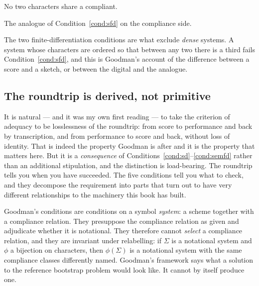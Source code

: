 \begin{condition}
\label{cond:semd}
No two characters share a compliant.
\end{condition}

\begin{condition}
\label{cond:semfd}
The analogue of Condition~\ref{cond:sfd} on the compliance side.
\end{condition}

\noindent
The two finite-differentiation conditions are what exclude
\emph{dense} systems.
A system whose characters are ordered so that between any two there
is a third fails Condition~\ref{cond:sfd}, and this is Goodman's
account of the difference between a score and a sketch, or between
the digital and the analogue.

\subsection{The roundtrip is derived, not primitive}
\label{sec:roundtrip}

It is natural --- and it was my own first reading --- to take the
criterion of adequacy to be losslessness of the roundtrip: from
score to performance and back by transcription, and from
performance to score and back, without loss of identity.
That is indeed the property Goodman is after and it is the property
that matters here.
But it is a \emph{consequence} of
Conditions~\ref{cond:sd}--\ref{cond:semfd} rather than an
additional stipulation, and the distinction is load-bearing.
The roundtrip tells you when you have succeeded.
The five conditions tell you what to check, and they decompose the
requirement into parts that turn out to have very different
relationships to the machinery this book has built.

\begin{remark}
\label{rem:invariance}
Goodman's conditions are conditions on a symbol \emph{system}: a
scheme together with a compliance relation.
They presuppose the compliance relation as given and adjudicate
whether it is notational.
They therefore cannot \emph{select} a compliance relation, and they
are invariant under relabelling: if $\Sigma$ is a notational system
and $\phi$ a bijection on characters, then $\phi(\Sigma)$ is a
notational system with the same compliance classes differently
named.
Goodman's framework says what a solution to the reference bootstrap
problem would look like.
It cannot by itself produce one.
\end{remark}

